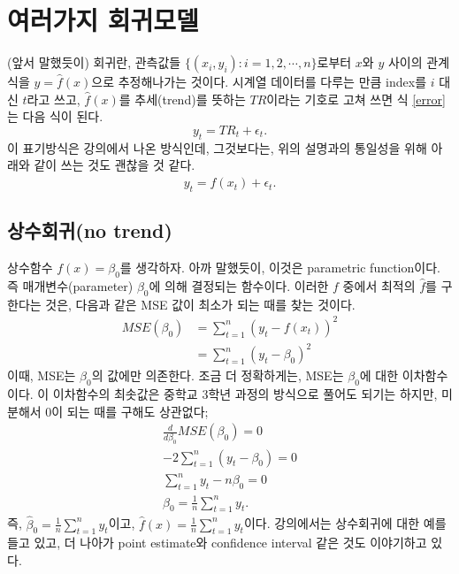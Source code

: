 \documentclass{article}
\begin{document}
\section{여러가지 회귀모델}
(앞서 말했듯이) 회귀란, 관측값들 \(\{(x_i,y_i):i=1,2,\cdots,n\}\)로부터 \(x\)와 \(y\) 사이의 관계식을 \(y=\hat f(x)\)으로 추정해나가는 것이다.
시계열 데이터를 다루는 만큼 index를 \(i\) 대신 \(t\)라고 쓰고, \(\hat f(x)\)를 추세(trend)를 뜻하는 $TR$이라는 기호로 고쳐 쓰면 식 \eqref{error}는 다음 식이 된다.
\[y_t=TR_t+\epsilon_t.\]
이 표기방식은 강의에서 나온 방식인데, 그것보다는, 위의 설명과의 통일성을 위해 아래와 같이 쓰는 것도 괜찮을 것 같다.
\[y_t=\hat f(x_t)+\epsilon_t.\]

\subsection{상수회귀(no trend)}
상수함수 \(f(x)=\beta_0\)를 생각하자.
아까 말했듯이, 이것은 parametric function이다.
즉 매개변수(parameter) \(\beta_0\)에 의해 결정되는 함수이다.
이러한 \(f\) 중에서 최적의 \(\hat f\)를 구한다는 것은, 다음과 같은 MSE 값이 최소가 되는 때를 찾는 것이다.
\begin{align*}
MSE(\beta_0)
& = \sum_{t=1}^n(y_t-f(x_t))^2\\
& = \sum_{t=1}^n(y_t-\beta_0)^2
\end{align*}
이때, MSE는 \(\beta_0\)의 값에만 의존한다.
조금 더 정확하게는, MSE는 \(\beta_0\)에 대한 이차함수이다.
이 이차함수의 최솟값은 중학교 3학년 과정의 방식으로 풀어도 되기는 하지만, 미분해서 0이 되는 때를 구해도 상관없다;
\begin{gather*}
\frac{d}{d\beta_0}MSE(\beta_0)=0\\
-2\sum_{t=1}^n(y_t-\beta_0)=0\\
\sum_{t=1}^ny_t-n\beta_0=0\\
\beta_0=\frac1n\sum_{t=1}^ny_t.
\end{gather*}
즉, \(\hat\beta_0=\frac1n\sum_{t=1}^ny_t\)이고, \(\hat f(x)=\frac1n\sum_{t=1}^ny_t\)이다.
강의에서는 상수회귀에 대한 예를 들고 있고, 더 나아가 point estimate와 confidence interval 같은 것도 이야기하고 있다.

\end{document}
